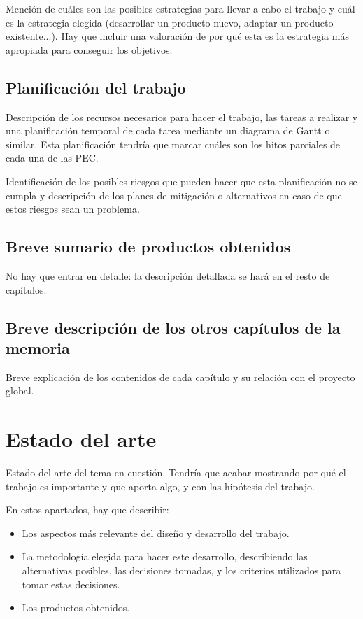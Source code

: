 \documentclass[IB,BIB]{TFUOC}%
\begin{document}
Mención de cuáles son las posibles estrategias para llevar a cabo el trabajo y cuál es la estrategia elegida (desarrollar un producto nuevo, adaptar un producto existente...). Hay que incluir una valoración de por qué esta es la estrategia más apropiada para conseguir los objetivos.   	



\section{Planificación del trabajo}

Descripción de los recursos necesarios para hacer el trabajo, las tareas a realizar y una planificación temporal de cada tarea mediante un diagrama de Gantt o similar. Esta planificación tendría que marcar cuáles son los hitos parciales de cada una de las PEC.

Identificación de los posibles riesgos que pueden hacer que esta planificación no se cumpla y descripción de los planes de mitigación o alternativos en caso de que estos riesgos sean un problema.


\section{Breve sumario de productos obtenidos}

No hay que entrar en detalle: la descripción detallada se hará en el resto de capítulos.


\section{Breve descripción de los otros capítulos de la memoria}

Breve explicación de los contenidos de cada capítulo y su relación con el proyecto global.

\chapter{Estado del arte}

Estado del arte del tema en cuestión.
Tendría que acabar mostrando por qué el trabajo es importante y que aporta algo, y con las hipótesis del trabajo.


En estos apartados, hay que describir:
\begin{itemize}
    \item Los aspectos más relevante del diseño y desarrollo del trabajo.
    \item La metodología elegida para hacer este desarrollo, describiendo las alternativas posibles, las decisiones tomadas, y los criterios utilizados para tomar estas decisiones.
    \item Los productos obtenidos.
\end{itemize}
\end{document}
